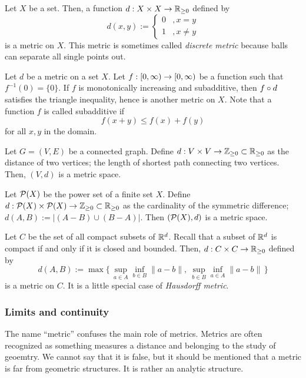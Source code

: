 \begin{ex}\label{ex:discrete metric}
Let $X$ be a set.
Then, a function $d:X\x X\to\R_{\ge0}$ defined by
\[d(x,y):=\begin{cases}0&,x=y\\1&,x\ne y\end{cases}\]
is a metric on $X$.
This metric is sometimes called \emph{discrete metric} because balls can separate all single points out.
\end{ex}
\begin{ex}\label{ex:subadditive function metric}
Let $d$ be a metric on a set $X$.
Let $f:[0,\oo)\to[0,\oo)$ be a function such that $f^{-1}(0)=\{0\}$.
If $f$ is monotonically increasing and subadditive, then $f\o d$ satisfies the triangle inequality, hence is another metric on $X$.
Note that a function $f$ is called subadditive if
\[f(x+y)\le f(x)+f(y)\]
for all $x,y$ in the domain.
\end{ex}
\begin{ex}
Let $G=(V,E)$ be a connected graph.
Define $d:V\x V\to\Z_{\ge0}\subset\R_{\ge0}$ as the distance of two vertices; the length of shortest path connecting two vertices.
Then, $(V,d)$ is a metric space.
\end{ex}
\begin{ex}
Let $\mathcal{P}(X)$ be the power set of a finite set $X$.
Define $d:\cP(X)\x\cP(X)\to\Z_{\ge0}\subset\R_{\ge0}$ as the cardinality of the symmetric difference; $d(A,B):=|(A-B)\cup(B-A)|$.
Then $(\mathcal{P}(X),d)$ is a metric space.
\end{ex}
\begin{ex}
Let $C$ be the set of all compact subsets of $\mathbb{R}^d$.
Recall that a subset of $\mathbb{R}^d$ is compact if and only if it is closed and bounded.
Then, $d:C\x C\to\R_{\ge0}$ defined by
\[d(A,B):=\max\{\,\sup_{a\in A}\inf_{b\in B}\|a-b\|,\ \sup_{b\in B}\inf_{a\in A}\|a-b\|\,\}\]
is a metric on $C$.
It is a little special case of \emph{Hausdorff metric}.
\end{ex}



\subsubsection{Limits and continuity}

The name ``metric'' confuses the main role of metrics.
Metrics are often recognized as something measures a distance and belonging to the study of geoemtry.
We cannot say that it is false, but it should be mentioned that a metric is far from geometric structures.
It is rather an analytic structure.

